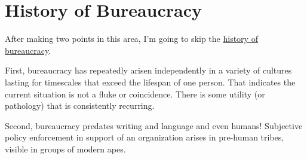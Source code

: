 \section{History of Bureaucracy}

After making two points in this area, I'm going to skip the \href{https://en.wikipedia.org/wiki/Bureaucracy#History}{history of bureaucracy}.  %

First, bureaucracy has repeatedly arisen independently in a variety of cultures lasting for timescales that exceed the lifespan of one person. That indicates the current situation is not a fluke or coincidence. There is some utility (or pathology) that is consistently recurring. 


Second, bureaucracy predates writing and language and even humans! Subjective policy enforcement in support of an organization arises in pre-human tribes, visible in groups of modern apes. 